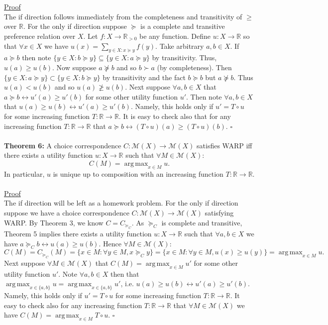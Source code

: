 \documentclass[11pt]{article}
\DeclareMathOperator*{\argmax}{arg\,max}
\theoremstyle{definition}
\theoremstyle{plain}
\begin{document}
\\
\\
\underline{Proof}
\\
The if direction follows immediately from the completeness and transitivity of $\geq$ over $\mathbb{R}$. For the only if direction suppose $\succeq$ is a complete and transitive preference relation over $X$. Let $f: X \to \mathbb{R}_{>0}$ be any function. Define $u: X \to \mathbb{R}$ so that $\forall x \in X$ we have $u(x)=\sum_{y \in X : x \succeq y} f(y)$. Take arbitrary $a,b \in X$. If $a \succeq b$ then note $\{y \in X : b \succeq y\} \subseteq \{y \in X : a \succeq y\}$ by transitivity. Thus, $u(a) \geq u(b)$. Now suppose $a \not \succeq b$ and so $b \succ a$ (by completeness). Then $\{y \in X : a \succeq y\} \subset \{y \in X : b \succeq y\}$ by transitivity and the fact $b \succeq b$ but $a \not \succeq b$. Thus $u(a)<u(b)$ and so $u(a) \not \geq u(b)$. Next suppose $\forall a,b \in X$ that $a\succeq b \leftrightarrow u'(a) \geq u'(b)$ for some other utility function $u'$. Then note $\forall a,b \in X$ that $u(a) \geq u(b) \leftrightarrow u'(a) \geq u'(b)$. Namely, this holds only if $u'=T \circ u$ for some increasing function $T: \mathbb{R} \to \mathbb{R}$. It is easy to check also that for any increasing function $T: \mathbb{R} \to \mathbb{R}$ that $a \succeq b \leftrightarrow (T\circ u)(a) \geq (T\circ u)(b)$. $\square$
\\
\\
\textbf{Theorem 6:} A choice correspondence $C:\mathcal{M}(X) \to \mathcal{M}(X)$ satisfies WARP iff there exists a utility function $u: X \to \mathbb{R}$ such that $\forall M \in \mathcal{M}(X)$:
$$C(M)=\argmax_{x \in M} u.$$
In particular, $u$ is unique up to composition with an increasing function $T:\mathbb{R} \to \mathbb{R}$.
\\
\\
\underline{Proof}
\\
The if direction will be left as a homework problem. For the only if direction suppose we have a choice correspondence $C:\mathcal{M}(X) \to \mathcal{M}(X)$ satisfying WARP. By Theorem 3, we know $C=C_{\succeq_C}$. As $\succeq_C$ is complete and transitive, Theorem 5 implies there exists a utility function $u: X \to \mathbb{R}$ such that $\forall a,b \in X$ we have $a \succeq_C b \leftrightarrow u(a) \geq u(b)$. Hence $\forall M \in \mathcal{M}(X)$: 
$$C(M)=C_{\succeq_C}(M)=\{x \in M : \forall y \in M,  x \succeq_C y\}=\{x \in M : \forall y \in M,  u(x) \geq u(y)\}=\argmax_{x \in M} u.$$
\noindent Next suppose $\forall M \in \mathcal{M}(X)$ that $C(M)=\argmax_{x \in M} u'$ for some other utility function $u'$. Note $\forall a,b \in X$ then that $\argmax_{x \in \{a,b\}} u=\argmax_{x \in \{a,b\}} u'$, i.e. $u(a) \geq u(b) \leftrightarrow u'(a) \geq u'(b)$. Namely, this holds only if $u'=T \circ u$ for some increasing function $T: \mathbb{R} \to \mathbb{R}$. It easy to check also for any increasing function $T: \mathbb{R} \to \mathbb{R}$ that $\forall M \in \mathcal{M}(X)$ we have $C(M)=\argmax_{x \in M} T \circ u$. $\square$
\end{document}
